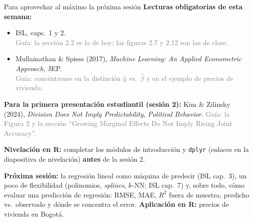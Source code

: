 \documentclass{beamer}
\newcommand{\1}{\mathbb{I}}
\begin{document}
\begin{frame}{Para aprovechar al máximo la próxima sesión}
\small
\textbf{Lecturas obligatorias de esta semana:}
\begin{itemize}\itemsep4pt
  \item ISL, caps.\ 1 y 2. \\ \textcolor{gray}{Guía: la sección 2.2 es la de hoy; las figuras 2.7 y 2.12 son las de clase.}
  \item Mullainathan \& Spiess (2017), \emph{Machine Learning: An Applied Econometric Approach}, JEP. \\ \textcolor{gray}{Guía: concéntrense en la distinción $\hat{y}$ vs.\ $\hat{\beta}$ y en el ejemplo de precios de vivienda.}
\end{itemize}

\textbf{Para la primera presentación estudiantil (sesión 2):} Kim \& Zilinsky (2024), \emph{Division Does Not Imply Predictability}, \emph{Political Behavior}. \textcolor{gray}{Guía: la Figura 2 y la sección ``Growing Marginal Effects Do Not Imply Rising Joint Accuracy''.}
\pause

\vspace{0.2cm}
\textbf{Nivelación en R:} completar los módulos de introducción y \texttt{dplyr} (enlaces en la diapositiva de nivelación) \textbf{antes} de la sesión 2.
\pause

\vspace{0.2cm}
\textbf{Próxima sesión:} la regresión lineal como máquina de predecir (ISL cap.\ 3), un poco de flexibilidad (polinomios, \emph{splines}, $k$-NN; ISL cap.\ 7) y, sobre todo, cómo evaluar una predicción de regresión: RMSE, MAE, $R^2$ fuera de muestra, predicho vs.\ observado y dónde se concentra el error. \textbf{Aplicación en R:} precios de vivienda en Bogotá.
\end{frame}
\end{document}
